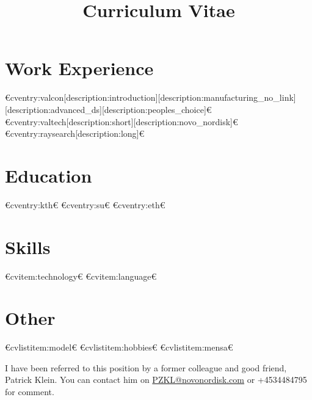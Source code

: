 
\title{Curriculum Vitae}



\newcommand{\role}{Senior Data Scientist}
\newcommand{\company}{Novo Nordisk}



  \makecvtitle
  

  \section{Work Experience}
  €cventry:valcon[description:introduction][description:manufacturing_no_link][description:advanced_ds][description:peoples_choice]€
  €cventry:valtech[description:short][description:novo_nordisk]€
  €cventry:raysearch[description:long]€

  \section{Education}
  €cventry:kth€
  €cventry:su€
  €cventry:eth€

  \section{Skills}
  €cvitem:technology€
  €cvitem:language€

  \section{Other}
  €cvlistitem:model€
  €cvlistitem:hobbies€
  €cvlistitem:mensa€

  \vspace{1cm}
  I have been referred to this position by a former colleague and good friend, Patrick Klein. You can contact him on \href{mailto:PZKL@novonordisk.com}{PZKL@novonordisk.com} or +4534484795 for comment.
  
